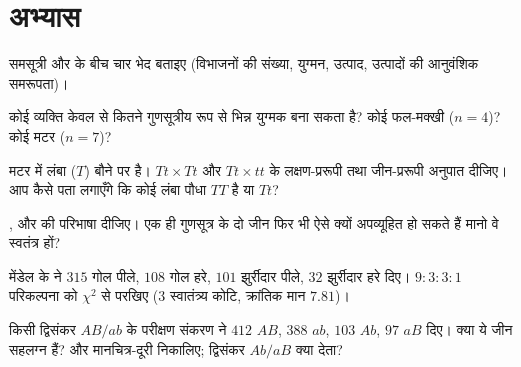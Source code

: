 \section{अभ्यास}

\begin{exercise}[$\star$]\label{exo:b2:meiosis-heredity:1}
समसूत्री और  के बीच चार भेद बताइए (विभाजनों की
संख्या, युग्मन, उत्पाद, उत्पादों की आनुवंशिक समरूपता)।
\end{exercise}

\begin{exercise}[$\star$]\label{exo:b2:meiosis-heredity:2}
कोई व्यक्ति केवल  से कितने गुणसूत्रीय रूप से भिन्न
युग्मक बना सकता है? कोई फल-मक्खी ($n = 4$)? कोई मटर ($n =
7$)?
\end{exercise}

\begin{exercise}[$\star$]\label{exo:b2:meiosis-heredity:3}
मटर में लंबा ($T$) बौने पर  है। $Tt \times Tt$ और $Tt \times tt$
के लक्षण-प्ररूपी तथा जीन-प्ररूपी अनुपात दीजिए। आप कैसे पता लगाएँगे कि
कोई लंबा पौधा $TT$ है या $Tt$?
\end{exercise}

\begin{exercise}[$\star$]\label{exo:b2:meiosis-heredity:4}
,  और  की परिभाषा दीजिए। एक ही
गुणसूत्र के दो जीन फिर भी ऐसे क्यों अपव्यूहित हो सकते हैं मानो वे
स्वतंत्र हों?
\end{exercise}

\begin{exercise}[$\star\star$]\label{exo:b2:meiosis-heredity:5}
मेंडेल के  ने $315$ गोल पीले, $108$ गोल हरे,
$101$ झुर्रीदार पीले, $32$ झुर्रीदार हरे दिए। $9 : 3 : 3 :
1$ परिकल्पना को $\chi^2$ से परखिए (3 स्वातंत्र्य कोटि, क्रांतिक मान
$7.81$)।
\end{exercise}

\begin{exercise}[$\star\star$]\label{exo:b2:meiosis-heredity:6}
किसी द्विसंकर $AB/ab$ के परीक्षण संकरण ने $412$ $AB$, $388$ $ab$, $103$
$Ab$, $97$ $aB$ दिए। क्या ये जीन सहलग्न हैं?  और मानचित्र-दूरी निकालिए; द्विसंकर $Ab/aB$ क्या देता?
\end{exercise}

